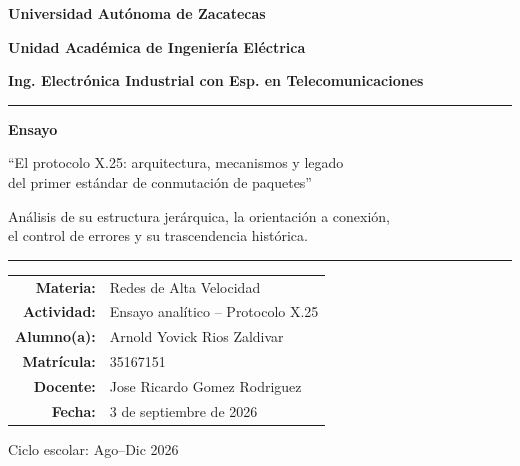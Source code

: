\documentclass[12pt,a4paper]{article}
\begin{document}
\begin{titlepage}
    \centering
    \vspace*{1cm}
    {\Large\bfseries Universidad Autónoma de Zacatecas\par}
    \vspace{0.4cm}
    {\large\bfseries Unidad Académica de Ingeniería Eléctrica\par}
    {\large\bfseries Ing. Electrónica Industrial con Esp. en Telecomunicaciones\par}
    \vspace{1.5cm}
    \noindent\rule{\textwidth}{0.8pt}
    \vspace{1cm}
    {\huge\bfseries Ensayo\par}
    \vspace{0.7cm}
    {\Large ``El protocolo X.25: arquitectura, mecanismos y legado \\ del primer estándar de conmutación de paquetes''\par}
    \vspace{0.6cm}
    {\normalsize Análisis de su estructura jerárquica, la orientación a conexión, \\ el control de errores y su trascendencia histórica.\par}
    \vspace{1cm}
    \noindent\rule{\textwidth}{0.8pt}
    \vspace{1.8cm}

    \begin{tabular}{r l}
        \textbf{Materia:}    & Redes de Alta Velocidad \\[0.35cm]
        \textbf{Actividad:}  & Ensayo analítico -- Protocolo X.25 \\[0.35cm]
        \textbf{Alumno(a):}  & Arnold Yovick Rios Zaldivar \\[0.35cm]
        \textbf{Matrícula:}  & 35167151 \\[0.35cm]
        \textbf{Docente:}    & Jose Ricardo Gomez Rodriguez \\[0.35cm]
        \textbf{Fecha:}      & 3 de septiembre de 2026
    \end{tabular}

    \vfill
    Ciclo escolar: Ago--Dic 2026
    \vspace*{0.5cm}
\end{titlepage}
\setcounter{page}{1}

\end{document}
